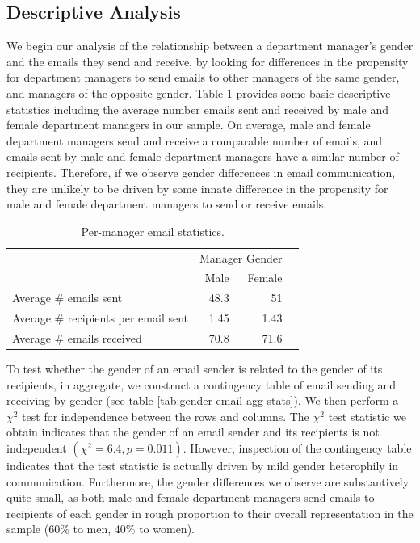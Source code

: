 \documentclass{pnastwo}
\begin{document}
\begin{article}
\section{Descriptive Analysis}

We begin our analysis of the relationship between a department manager's gender and the emails they send and receive, by looking for differences in the propensity for department managers to send emails to other managers of the same gender, and managers of the opposite gender. Table \ref{tab:email agg stats} provides some basic descriptive statistics including the average number emails sent and received by male and female department managers in our sample. On average, male and female department managers send and receive a comparable number of emails, and emails sent by male and female department managers have a similar number of recipients. Therefore, if we observe gender differences in email communication, they are unlikely to be driven by some innate difference in the propensity for male and female department managers to send or receive emails. 
	
\begin{table}
  \centering
  \begin{tabular}{m{2.1in}rrr}
    \toprule
    & \multicolumn{2}{c}{Manager Gender} \\
    \cmidrule{2-3}
    & Male & Female  \\
    \midrule
    Average \# emails sent & 48.3 & 51 \\
    Average \# recipients per email sent & 1.45 & 1.43 \\
    \midrule
    Average \# emails received & 70.8 & 71.6 \\
    \bottomrule
  \end{tabular}
  \caption{\label{tab:email agg stats} Per-manager email
    statistics.}
\end{table}

To test whether the gender of an email sender is related to the gender of its recipients, in aggregate, we construct a contingency table of email sending and receiving by gender (see table \ref{tab:gender email agg stats}). We then perform a $\chi^2$ test for independence between the rows and columns. The $\chi^2$ test statistic we obtain indicates that the gender of an email sender and its recipients is not independent $(\chi^2 = 6.4, p = 0.011)$. However, inspection of the contingency table indicates that the test statistic is actually driven by mild gender heterophily in communication. Furthermore, the gender differences we observe are substantively quite small, as both male and female department managers send emails to recipients of each gender in rough proportion to their overall representation in the sample (60\% to men, 40\% to women).  
	

\end{article}
\end{document}
